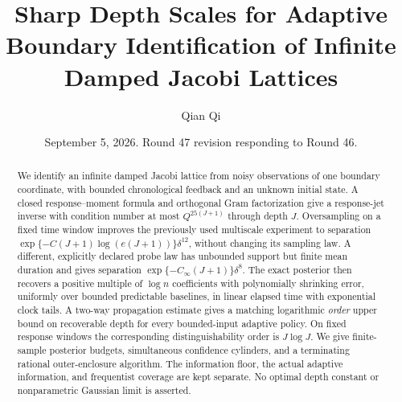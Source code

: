 \documentclass[11pt,reqno]{amsart}
\title[Sharp depth scales for boundary identification]{Sharp Depth Scales for Adaptive Boundary Identification of Infinite Damped Jacobi Lattices}
\author{Qian Qi}
\date{September 5, 2026. Round 47 revision responding to Round 46.}
\theoremstyle{definition}\newtheorem{definition}[theorem]{Definition}
\theoremstyle{remark}\newtheorem{remark}[theorem]{Remark}
\begin{document}
\begin{abstract}
We identify an infinite damped Jacobi lattice from noisy observations of one
boundary coordinate, with bounded chronological feedback and an unknown initial
state. A closed response--moment formula and orthogonal Gram factorization give
a response-jet inverse with condition number at most $Q^{25(J+1)}$ through depth
$J$. Oversampling on a fixed time window improves the previously used multiscale
experiment to separation $\exp\{-C(J+1)\log(e(J+1))\}\delta^{12}$, without
changing its sampling law. A different, explicitly declared probe law has
unbounded support but finite mean duration and gives separation
$\exp\{-C_\infty(J+1)\}\delta^8$. The exact posterior then recovers a positive
multiple of $\log n$ coefficients with polynomially shrinking error, uniformly
over bounded predictable baselines, in linear elapsed time with exponential
clock tails. A two-way propagation estimate gives a matching logarithmic
\emph{order} upper bound on recoverable depth for every bounded-input adaptive
policy. On fixed response windows the corresponding distinguishability order
is $J\log J$. We give finite-sample posterior budgets, simultaneous confidence
cylinders, and a terminating rational outer-enclosure algorithm. The information
floor, the actual adaptive information, and frequentist coverage are kept
separate. No optimal depth constant or nonparametric Gaussian limit is asserted.
\end{abstract}
\maketitle\tableofcontents













\end{document}
